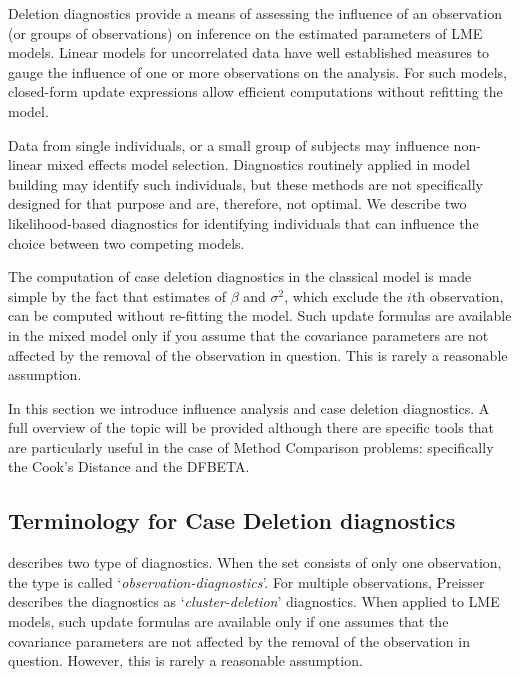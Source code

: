 \documentclass[12pt, a4paper]{report}
\theoremstyle{plain}
\theoremstyle{definition}
\theoremstyle{remark}
\begin{document}
	Deletion diagnostics provide a means of assessing the influence of an observation (or groups of observations) on inference on the estimated parameters of LME models. Linear models for uncorrelated data have well established measures to gauge the influence of one or more observations on the analysis. For such models, closed-form update expressions allow efficient computations without refitting the model.
	
	Data from single individuals, or a small group of subjects may influence non-linear mixed effects model selection. Diagnostics routinely applied in model building may identify such individuals, but these methods are not specifically designed for that purpose and are, therefore, not optimal. We describe two likelihood-based diagnostics for identifying individuals that can influence the choice between two competing models.
	
	
	The computation of case deletion diagnostics in the classical model is made simple by the fact that estimates of $\beta$ and $\sigma^2$, which exclude the $i$th observation, can be computed without re-fitting the model. Such update formulas are available in the mixed model only if you assume that the covariance parameters are not affected by the removal of the observation in question. This is rarely a reasonable assumption.
	
	
	In this section we introduce influence analysis and case deletion diagnostics. A full overview of the topic will be provided although there are specific tools that are particularly useful in the case of Method Comparison problems: specifically the Cook's Distance and the DFBETA.
	
		
		
		\subsection{Terminology for Case Deletion diagnostics} %
		
		\citet{preisser} describes two type of diagnostics. When the set consists of only one observation, the type is called
		`\textit{observation-diagnostics}'. For multiple observations, Preisser describes the diagnostics as `\textit{cluster-deletion}' diagnostics. When applied to LME models, such update formulas are available only if one assumes that the covariance parameters are not affected by the removal of the observation in question. However, this is rarely a reasonable assumption.
		
	
	
\end{document}
